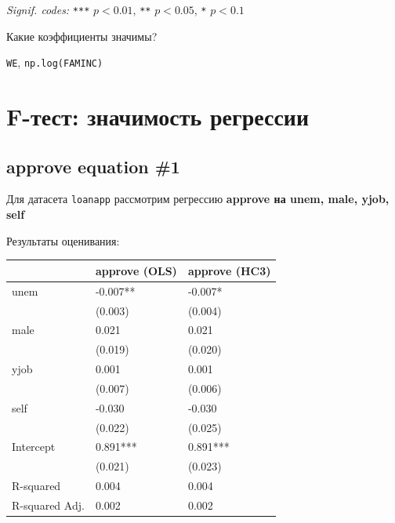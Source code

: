 \documentclass[
  russian,
]{article}
\newcounter{none} %
\begin{document}
\emph{Signif. codes:} \texttt{***} \(p<0.01\), \texttt{**} \(p<0.05\),
\texttt{*} \(p<0.1\)

Какие коэффициенты значимы?

\begin{tcolorbox}[enhanced jigsaw, arc=.35mm, bottomrule=.15mm, bottomtitle=1mm, breakable, colback=white, colbacktitle=quarto-callout-note-color!10!white, colframe=quarto-callout-note-color-frame, coltitle=black, left=2mm, leftrule=.75mm, opacityback=0, opacitybacktitle=0.6, rightrule=.15mm, title=\textcolor{quarto-callout-note-color}{\faInfo}\hspace{0.5em}{Коэффициенты, значимые на уровне 5\% (по робастным стандартным ошибкам
HC3)}, titlerule=0mm, toprule=.15mm, toptitle=1mm]

\texttt{WE}, \texttt{np.log(FAMINC)}

\end{tcolorbox}

\section{F-тест: значимость
регрессии}\label{f-ux442ux435ux441ux442-ux437ux43dux430ux447ux438ux43cux43eux441ux442ux44c-ux440ux435ux433ux440ux435ux441ux441ux438ux438}

\subsection{approve equation \#1}\label{approve-equation-1-2}

Для датасета \texttt{loanapp} рассмотрим регрессию \textbf{approve на
unem, male, yjob, self}

Результаты оценивания:

{\def\LTcaptype{none} %
\begin{longtable}[]{@{}lll@{}}
\toprule\noalign{}
& approve (OLS) & approve (HC3) \\
\midrule\noalign{}
\endhead
\bottomrule\noalign{}
\endlastfoot
unem & -0.007** & -0.007* \\
& (0.003) & (0.004) \\
male & 0.021 & 0.021 \\
& (0.019) & (0.020) \\
yjob & 0.001 & 0.001 \\
& (0.007) & (0.006) \\
self & -0.030 & -0.030 \\
& (0.022) & (0.025) \\
Intercept & 0.891*** & 0.891*** \\
& (0.021) & (0.023) \\
R-squared & 0.004 & 0.004 \\
R-squared Adj. & 0.002 & 0.002 \\
\end{longtable}
}
\end{document}
